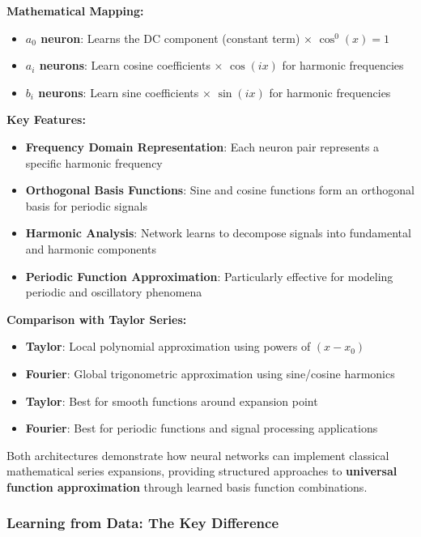 \textbf{Mathematical Mapping:}

\begin{itemize}
\item \textbf{$a_0$ neuron}: Learns the DC component (constant term) × $\cos^0(x) = 1$
\item \textbf{$a_i$ neurons}: Learn cosine coefficients × $\cos(ix)$ for harmonic frequencies
\item \textbf{$b_i$ neurons}: Learn sine coefficients × $\sin(ix)$ for harmonic frequencies
\end{itemize}

\textbf{Key Features:}

\begin{itemize}
\item \textbf{Frequency Domain Representation}: Each neuron pair represents a specific harmonic frequency
\item \textbf{Orthogonal Basis Functions}: Sine and cosine functions form an orthogonal basis for periodic signals
\item \textbf{Harmonic Analysis}: Network learns to decompose signals into fundamental and harmonic components
\item \textbf{Periodic Function Approximation}: Particularly effective for modeling periodic and oscillatory phenomena
\end{itemize}

\textbf{Comparison with Taylor Series:}

\begin{itemize}
\item \textbf{Taylor}: Local polynomial approximation using powers of $(x-x_0)$
\item \textbf{Fourier}: Global trigonometric approximation using sine/cosine harmonics
\item \textbf{Taylor}: Best for smooth functions around expansion point
\item \textbf{Fourier}: Best for periodic functions and signal processing applications
\end{itemize}

Both architectures demonstrate how neural networks can implement classical mathematical series expansions, providing structured approaches to \textbf{universal function approximation} through learned basis function combinations.

\subsubsection{Learning from Data: The Key Difference}

